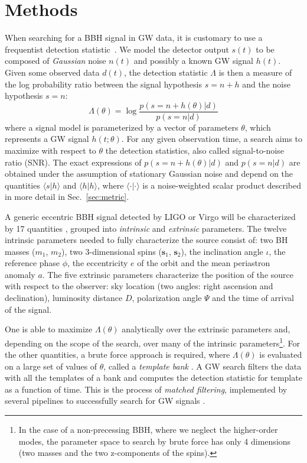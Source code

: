 \documentclass[twocolumn,showpacs,preprintnumbers,nofootinbib,prd,
superscriptaddress,10pt]{revtex4-2}
\newcommand{\scalar}[2]{\langle #1|#2 \rangle}
\begin{document}
\section{Methods} \label{sec:methods}

When searching for a BBH signal in GW data, it is customary to use a frequentist detection statistic~\cite{Creighton_book, Maggiore:2007ulw, Harry:2016ijz, PhysRevD.97.023004}.
We model the detector output $s(t)$ to be composed of {\it Gaussian} noise $n(t)$ and possibly a known GW signal $h(t)$.
Given some observed data $d(t)$, the detection statistic $\Lambda$ is then a measure of the log probability ratio between the signal hypothesis $s = n+h$ and the noise hypothesis $s = n$:
\begin{equation}\label{eq:LL}
	\Lambda(\theta) = \log\frac{p(s = n+h(\theta)|d)}{p(s = n|d)}
\end{equation}
where a signal model is parameterized by a vector of parameters $\theta$, which represents a GW signal $h(t;\theta)$.
For any given observation time, a search aims to maximize with respect to $\theta$ the detection statistics, also called signal-to-noise ratio (SNR).
The exact expressions of $p(s = n+h(\theta)|d)$ and $p(s = n|d)$ are obtained under the assumption of stationary Gaussian noise and  depend on the quantities $\scalar{s}{h}$ and $\scalar{h}{h}$, where $\scalar{\cdot}{\cdot}$ is a noise-weighted scalar product described in more detail in Sec.~\ref{sec:metric}.

A generic eccentric BBH signal detected by LIGO or Virgo will be characterized by 17 quantities \cite{Sathyaprakash_2009}, grouped into \textit{intrinsic} and \textit{extrinsic} parameters.
The twelve intrinsic parameters needed to fully characterize the source consist of: two BH masses ($m_1$, $m_2$), two 3-dimensional spins ($\mathbf{s}_1$, $\mathbf{s}_2$), the inclination angle $\iota$, the reference phase $\phi$, the eccentricity $e$ of the orbit and the mean periastron anomaly $a$.
The five extrinsic parameters characterize the position of the source with respect to the observer: sky location (two angles: right ascension and declination), luminosity distance $D$, polarization angle $\Psi$ and the time of arrival of the signal.

One is able to maximize $\Lambda(\theta)$ analytically over the extrinsic parameters and, depending on the scope of the search, over many of the intrinsic parameters\footnote{
In the case of a non-precessing BBH, where we neglect the higher-order modes, the parameter space to search by brute force has only 4 dimensions (two masses and the two z-components of the spins).
}.
For the other quantities, a brute force approach is required, where $\Lambda(\theta)$ is evaluated on a large set of values of $\theta$, called a {\it template bank} \cite{PhysRevD.77.104017, Mukherjee:2018yra}.
A GW search filters the data with all the templates of a bank and computes the detection statistic for template as a function of time. This is the process of {\it matched filtering}, implemented by several pipelines to successfully search for GW signals \cite{Privitera:2013xza, Usman:2015kfa, Capano:2016dsf, PhysRevD.95.042001, gstlal_paper2, Aubin:2020goo, Chu:2020pjv}.
\end{document}
